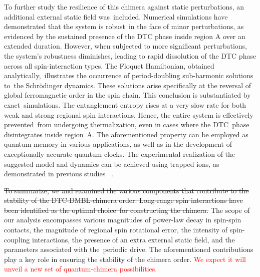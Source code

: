 \documentclass[a4paper,11pt]{article}
\newcommand{\red}[1]{\textcolor{red}{#1}}
\begin{document}
To further study the resilience of this chimera against static perturbations, an additional external static field was included. Numerical simulations have demonstrated that the system is robust in the face of minor perturbations, as evidenced by the sustained presence of the DTC phase inside region A over an extended duration. However, when subjected to more significant perturbations, the system's robustness diminishes, leading to rapid dissolution of the DTC phase across all spin-interaction types. The Floquet Hamiltonian, obtained analytically, illustrates the occurrence of period-doubling sub-harmonic solutions to the Schr\"odinger dynamics. These solutions arise specifically at the reversal of global ferromagnetic order in the spin chain. This conclusion is substantiated by exact simulations. The entanglement entropy rises at a very slow rate for both weak and strong regional spin interactions. Hence, the entire system is effectively prevented from undergoing thermalization, even in cases where the DTC phase disintegrates inside region A. The aforementioned property can be employed as quantum memory in various applications, as well as in the development of exceptionally accurate quantum clocks. The experimental realization of the suggested model and dynamics can be achieved using trapped ions, as demonstrated in previous studies ~\cite{sakurai_phys_nodate, Friedenauer2008}.

\sout{To summarize, we and examined the various components that contribute to the stability of the DTC-DMBL-chimera order. Long-range spin interactions have been identified as the optimal choice for constructing the chimera.} The scope of our analysis encompasses various magnitudes of power-law decay in spin-spin contacts, the magnitude of regional spin rotational error, the intensity of spin-coupling interactions, the presence of an extra external static field, and the parameters associated with the periodic drive. The aforementioned contributions play a key role in ensuring the stability of the chimera order. \red{We expect it will unveil a new set of quantum-chimera possibilities.}



\end{document}
